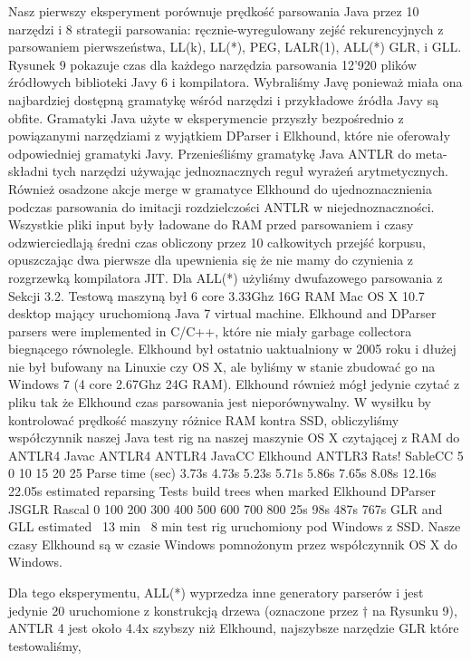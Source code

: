 Nasz pierwszy eksperyment porównuje prędkość parsowania Java przez 10 narzędzi
i 8 strategii parsowania: ręcznie-wyregulowany zejść rekurencyjnych
z parsowaniem pierwszeństwa, LL(k), LL(*), PEG, LALR(1), ALL(*)
GLR, i GLL. Rysunek 9 pokazuje czas dla każdego narzędzia parsowania
12'920 plików źródłowych biblioteki Javy 6 i kompilatora.
Wybraliśmy Javę ponieważ miała ona najbardziej dostępną gramatykę wśród narzędzi
i przykładowe źródła Javy są obfite.
Gramatyki Java użyte w eksperymencie przyszły bezpośrednio z powiązanymi narzędziami
z wyjątkiem DParser i Elkhound, które nie oferowały odpowiedniej gramatyki Javy.
Przenieśliśmy gramatykę Java ANTLR do meta-składni tych narzędzi używając
jednoznacznych reguł wyrażeń arytmetycznych. Również osadzone akcje merge w
gramatyce Elkhound do ujednoznacznienia podczas parsowania do imitacji
rozdzielczości ANTLR w niejednoznaczności. Wszystkie pliki input były
ładowane do RAM przed parsowaniem i czasy odzwierciedlają średni czas obliczony
przez 10 całkowitych przejść korpusu, opuszczając dwa pierwsze dla
upewnienia się że nie mamy do czynienia z rozgrzewką kompilatora JIT.
Dla ALL(*) użyliśmy dwufazowego parsowania z Sekcji 3.2.
Testową maszyną był 6 core 3.33Ghz 16G RAM Mac OS X 10.7 desktop mający uruchomioną
Java 7 virtual machine. Elkhound and DParser parsers were
implemented in C/C++, które nie miały garbage collectora biegnącego równolegle.
Elkhound był ostatnio uaktualniony w 2005 roku
i dłużej nie był bufowany na Linuxie czy OS X, ale byliśmy w stanie zbudować go na
Windows 7 (4 core 2.67Ghz 24G RAM). Elkhound również mógł jedynie czytać z
pliku tak że Elkhound czas parsowania jest nieporównywalny.
W wysiłku by kontrolować prędkość maszyny różnice RAM kontra SSD, obliczyliśmy
współczynnik naszej Java test rig na naszej maszynie OS X czytającej z RAM do
ANTLR4
Javac
ANTLR4
ANTLR4
JavaCC
Elkhound
ANTLR3
Rats!
SableCC
5 0
10
15
20
25
Parse time (sec)
3.73s 4.73s 5.23s 5.71s 5.86s
7.65s 8.08s
12.16s
22.05s
estimated
reparsing
Tests build trees when marked
Elkhound
DParser
JSGLR
Rascal
0
100
200
300
400
500
600
700
800
25s
98s
487s
767s
GLR and GLL
estimated
~13
min
~8
min
test rig uruchomiony pod Windows z SSD. Nasze czasy Elkhound są w czasie Windows
pomnożonym przez współczynnik OS X do Windows.
\par
Dla tego eksperymentu, ALL(*) wyprzedza inne generatory parserów i jest
jedynie 20%
uruchomione z konstrukcją drzewa (oznaczone przez † na Rysunku 9), ANTLR 4 jest
około 4.4x szybszy niż Elkhound, najszybsze narzędzie GLR które testowaliśmy,
